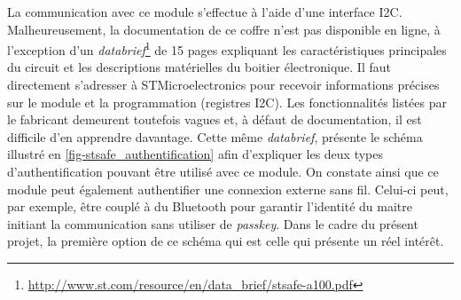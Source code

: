 La communication avec ce module s'effectue à l'aide d'une interface I2C.
Malheureusement, la documentation de ce coffre n'est pas disponible en ligne, à l'exception d'un \textit{databrief}\footnote{\url{http://www.st.com/resource/en/data_brief/stsafe-a100.pdf}} de 15 pages expliquant les caractéristiques principales du circuit et les descriptions matérielles du boitier électronique. Il faut directement s'adresser à STMicroelectronics pour recevoir informations précises sur le module et la programmation (registres I2C). Les fonctionnalités listées par le fabricant demeurent toutefois vagues et, à défaut de documentation, il est difficile d'en apprendre davantage. Cette même \textit{databrief}, présente le schéma illustré en \cref{fig-stsafe_authentification} afin d'expliquer les deux types d'authentification pouvant être utilisé avec ce module. On constate ainsi que ce module peut également authentifier une connexion externe sans fil. Celui-ci peut, par exemple, être couplé à du Bluetooth pour garantir l'identité du maitre initiant la communication sans utiliser de \textit{passkey}. Dans le cadre du présent projet, la première option de ce schéma qui est celle qui présente un réel intérêt.









